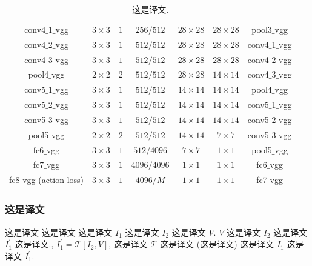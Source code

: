 \documentclass[sigconf]{acmart}
\begin{document}
\begin{table}[t]
\begin{center}
{\begin{tabular}{ | c | c | c | c | c | c |  c |}
					conv4$\_$1$\_$vgg & $3\times3$ & $1$ & $256/512$ & $28\times28$ & $28\times28$ & pool3$\_$vgg \\
					conv4$\_$2$\_$vgg & $3\times3$ & $1$ & $512/512$ & $28\times28$ & $28\times28$ & conv4$\_$1$\_$vgg \\
					conv4$\_$3$\_$vgg & $3\times3$ & $1$ & $512/512$ & $28\times28$ & $28\times28$ & conv4$\_$2$\_$vgg \\
					pool4$\_$vgg & $2\times2$ & $2$ & $512/512$ & $28\times28$ & $14\times14$ & conv4$\_$3$\_$vgg \\
					conv5$\_$1$\_$vgg & $3\times3$ & $1$ & $512/512$ & $14\times14$ & $14\times14$ & pool4$\_$vgg \\
					conv5$\_$2$\_$vgg & $3\times3$ & $1$ & $512/512$ & $14\times14$ & $14\times14$ & conv5$\_$1$\_$vgg \\
					conv5$\_$3$\_$vgg & $3\times3$ & $1$ & $512/512$ & $14\times14$ & $14\times14$ & conv5$\_$2$\_$vgg \\
					pool5$\_$vgg & $2\times2$ & $2$ & $512/512$ & $14\times14$ & $7\times7$ & conv5$\_$3$\_$vgg \\
					fc6$\_$vgg & $3\times3$ & $1$ & $512/4096$ & $7\times7$ & $1\times1$ & pool5$\_$vgg \\
					fc7$\_$vgg & $3\times3$ & $1$ & $4096/4096$ & $1\times1$ & $1\times1$ & fc6$\_$vgg \\
					fc8$\_$vgg (action$\_$loss) & $3\times3$ & $1$ & $4096/M$ & $1\times1$ & $1\times1$ & fc7$\_$vgg \\
					\hline
				\end{tabular}
			} 
			\vspace{2ex}
			\caption{这是译文.  \label{tab:stacked_model}}
			\vspace{-6ex}
		\end{center}
	\end{table} 
	
	\subsubsection{\textbf{这是译文}}
	\label{sec:motionnet}
	
	这是译文 \cite{hidden_zhu_17} 这是译文 \cite{jasonUnsup2016,guided_flow_17,densenet_denseflow_icip17} 这是译文 $I_{1}$ 这是译文 $I_{2}$ 这是译文 $V$. $V$ 这是译文 $I_{2}$ 这是译文 $I_{1}^{\prime}$ 这是译文., $I_{1}^{\prime} = \mathcal{T}[I_{2}, V]$, 这是译文 $\mathcal{T}$ 这是译文 (这是译文) 这是译文 $I_{1}$ 这是译文 $I_{1}^{\prime}$. 
	
\end{document}
